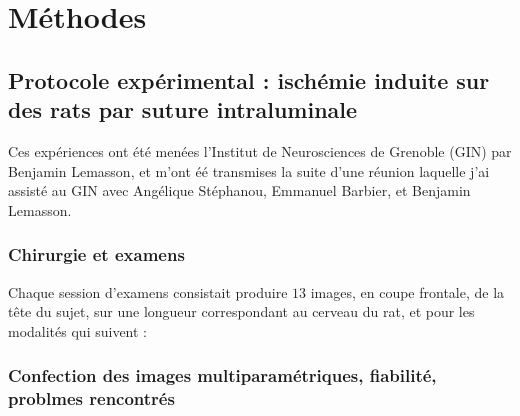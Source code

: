 \section{M\'ethodes}

\makeatletter
\renewcommand{\thefigure}{\ifnum \c@section>\z@ \thesection.\fi
 \@arabic\c@figure}
\makeatother
\begin{comment}
Remarque : pour renuméroter les sous-figures de la même manière
           (avec le package 'subfigure'), il suffit de rajouter
	   la ligne \let\p@subfigure\thefigure dans le préambule.
\end{comment}

\subsection{Protocole exp\'erimental : isch\'emie induite sur des rats par suture intraluminale}

Ces exp\'eriences ont \'et\'e men\'ees  l'Institut de Neurosciences de Grenoble (GIN) par Benjamin Lemasson, %
et m'ont \'e\'e transmises  la suite d'une r\'eunion  laquelle j'ai assist\'e au GIN %
avec Ang\'elique St\'ephanou, Emmanuel Barbier, et Benjamin Lemasson.



\subsubsection{Chirurgie et examens}



Chaque session d'examens consistait  produire $13$ images, en coupe frontale, de la t\^ete du sujet, %
sur une longueur correspondant au cerveau du rat, et pour les modalit\'es qui suivent :

\subsubsection{Confection des images multiparam\'etriques, fiabilit\'e, problmes rencontr\'es}





